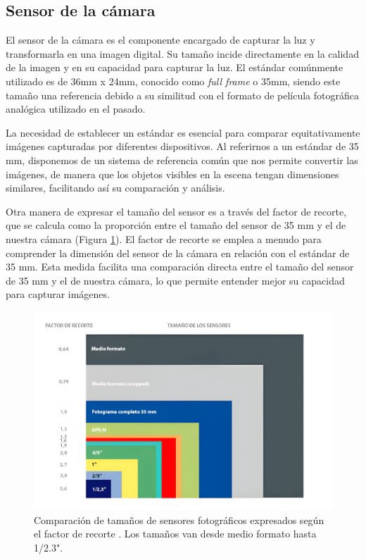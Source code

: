 \subsection*{Sensor de la cámara}
El sensor de la cámara es el componente encargado de capturar la luz y transformarla en una imagen digital. Su tamaño incide directamente en la calidad de la imagen y en su capacidad para capturar la luz. El estándar comúnmente utilizado es de 36mm x 24mm, conocido como \textit{full frame} o 35mm, siendo este tamaño una referencia debido a su similitud con el formato de película fotográfica analógica utilizado en el pasado.

La necesidad de establecer un estándar es esencial para comparar equitativamente imágenes capturadas por diferentes dispositivos. Al referirnos a un estándar de 35 mm, disponemos de un sistema de referencia común que nos permite convertir las imágenes, de manera que los objetos visibles en la escena tengan dimensiones similares, facilitando así su comparación y análisis.

Otra manera de expresar el tamaño del sensor es a través del factor de recorte, que se calcula como la proporción entre el tamaño del sensor de 35 mm y el de nuestra cámara (Figura \ref{fig12}). El factor de recorte se emplea a menudo para comprender la dimensión del sensor de la cámara en relación con el estándar de 35 mm. Esta medida facilita una comparación directa entre el tamaño del sensor de 35 mm y el de nuestra cámara, lo que permite entender mejor su capacidad para capturar imágenes.

\begin{figure}[h]
	\centering
	\includegraphics[scale=0.08]{imagenes/cap2/tam_sensor_factor.jpeg}
	\caption[Tipos de tamaños de sensor.]{Comparación de tamaños de sensores fotográficos expresados según el factor de recorte \cite{48}. Los tamaños van desde medio formato hasta 1/2.3".}
	\label{fig12}
\end{figure}

